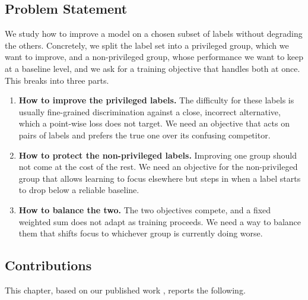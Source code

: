 \subsection{Problem Statement}
\label{subsec:fairpo-problem}

We study how to improve a model on a chosen subset of labels without degrading the
others. Concretely, we split the label set into a privileged group, which we want
to improve, and a non-privileged group, whose performance we want to keep at a
baseline level, and we ask for a training objective that handles both at once. This
breaks into three parts.

\begin{enumerate}
	\item \textbf{How to improve the privileged labels.} The difficulty for these
	labels is usually fine-grained discrimination against a close, incorrect
	alternative, which a point-wise loss does not target. We need an objective that
	acts on pairs of labels and prefers the true one over its confusing competitor.
	
	\item \textbf{How to protect the non-privileged labels.} Improving one group
	should not come at the cost of the rest. We need an objective for the
	non-privileged group that allows learning to focus elsewhere but steps in when
	a label starts to drop below a reliable baseline.
	
	\item \textbf{How to balance the two.} The two objectives compete, and a fixed
	weighted sum does not adapt as training proceeds. We need a way to balance them
	that shifts focus to whichever group is currently doing worse.
\end{enumerate}

\subsection{Contributions}
\label{subsec:fairpo-contributions}

This chapter, based on our published work \citep{mondal2025fairpo}, reports the
following.

